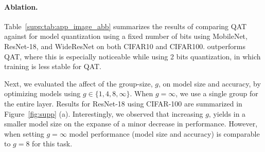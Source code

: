 \paragraph{Ablation.} Table~\ref{supp:tab:app_image_abb} summarizes the results of comparing QAT against \diffq for model quantization using a fixed number of bits using MobileNet, ResNet-18, and WideResNet on both CIFAR10 and CIFAR100. \diffq outperforms QAT, where this is especially noticeable while using 2 bits quantization, in which training is less stable for QAT. 

Next, we evaluated the affect of the group-size, $g$, on model size and accuracy, by optimizing \diffq models using $g \in \{1, 4, 8, \infty \}$. When $g=\infty$, we use a single group for the entire layer. Results for ResNet-18 using CIFAR-100 are summarized in Figure~\ref{fig:supp} (a). Interestingly, we observed that increasing $g$, yields in a smaller model size on the expanse of a minor decrease in performance. However, when setting $g=\infty$ model performance (model size and accuracy) is comparable to $g=8$ for this task.

